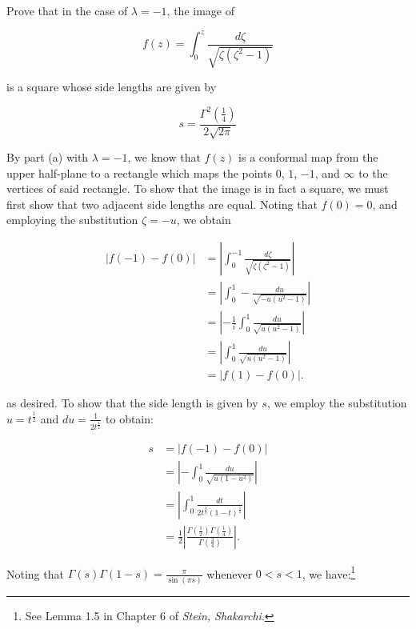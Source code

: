 Prove that in the case of $\lambda = -1$, the image of

$$
f(z) = \int_0^z \frac{d\zeta}{\sqrt{\zeta (\zeta^2 - 1)}}
$$

is a square whose side lengths are given by

$$
s = \frac{\Gamma^2\left(\frac{1}{4}\right)}{2 \sqrt{2 \pi}}
$$

\begin{solution}
    By part (a) with $\lambda = -1$, we know that $f(z)$ is a conformal map from the upper half-plane to a rectangle
    which maps the points $0$, $1$, $-1$, and $\infty$ to the vertices of said rectangle. To show that the image is in 
    fact a square, we must first show that two adjacent side lengths are equal. Noting that $f(0) = 0$, and employing 
    the substitution $\zeta = -u$, we obtain

    \begin{align*}
        \left| f(-1) - f(0) \right| &= \left| \int_0^{-1} \frac{d\zeta}{\sqrt{\zeta(\zeta^2 - 1)}} \right| \\
                                    &= \left| \int_0^{1} -\frac{du}{\sqrt{-u(u^2 - 1)}} \right| \\
                                    &= \left| -\frac{1}{i} \int_0^{1} \frac{du}{\sqrt{u(u^2 - 1)}} \right| \\
                                    &= \left| \int_0^{1} \frac{du}{\sqrt{u(u^2 - 1)}} \right| \\
                                    &= \left| f(1) - f(0) \right|.
    \end{align*}

    as desired. To show that the side length is given by $s$, we employ the substitution $u = t^{\frac{1}{2}}$ and 
    $du = \frac{1}{2 t^{\frac{1}{2}}}$ to obtain:

    \begin{align*}
        s &= \left| f(-1) - f(0) \right| \\
          &= \left| - \int_0^1 \frac{du}{\sqrt{u (1 - u^2)}} \right| \\
          &= \left| \int_0^1 \frac{dt}{2 t^{\frac{3}{4}} (1 - t)^{\frac{1}{2}}} \right| \\
          &= \frac{1}{2} \left| \frac{\Gamma\left(\frac{1}{2}\right)\Gamma\left(\frac{1}{4}\right)}{\Gamma\left(\frac{3}{4}\right)} \right|.
    \end{align*}

    \pagebreak
    Noting that $\Gamma(s) \Gamma(1 - s) = \frac{\pi}{\sin(\pi s)}$ whenever $0 < s < 1$, we have:\footnote{
        See Lemma 1.5 in Chapter 6 of \textit{Stein, Shakarchi}.
    }


\end{solution}
